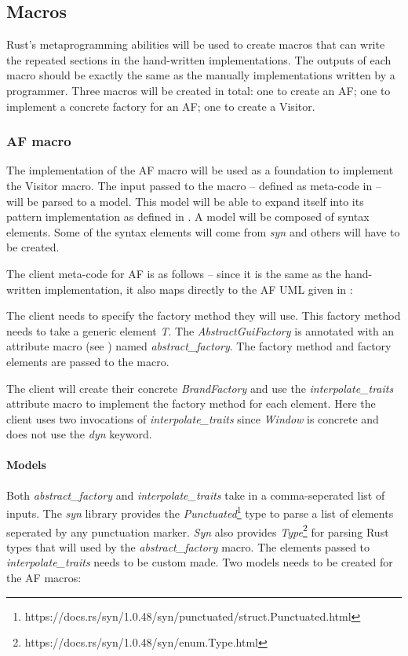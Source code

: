 
\subsection{Macros}
Rust's metaprogramming abilities will be used to create macros that can write the repeated sections in the hand-written implementations.
The outputs of each macro should be exactly the same as the manually implementations written by a programmer.
Three macros will be created in total: one to create an AF; one to implement a concrete factory for an AF; one to create a Visitor.

\subsubsection{AF macro}
The implementation of the AF macro will be used as a foundation to implement the Visitor macro.
The input passed to the macro -- defined as meta-code in  -- will be parsed to a model.
This model will be able to expand itself into its pattern implementation as defined in .
A model will be composed of syntax elements.
Some of the syntax elements will come from \textit{syn} and others will have to be created.

The client meta-code for AF is as follows -- since it is the same as the hand-written implementation, it also maps directly to the AF UML given in :


The client needs to specify the factory method they will use.
This factory method needs to take a generic element \textit{T}.
The \textit{AbstractGuiFactory} is annotated with an attribute macro (see ) named \textit{abstract\_factory}.
The factory method and factory elements are passed to the macro.

The client will create their concrete \textit{BrandFactory} and use the \textit{interpolate\_traits} attribute macro to implement the factory method for each element.
Here the client uses two invocations of \textit{interpolate\_traits} since \textit{Window} is concrete and does not use the \textit{dyn} keyword.

\paragraph{Models}
Both \textit{abstract\_factory} and \textit{interpolate\_traits} take in a comma-seperated list of inputs.
The \textit{syn} library provides the \textit{Punctuated}\footnote{https://docs.rs/syn/1.0.48/syn/punctuated/struct.Punctuated.html} type to parse a list of elements seperated by any punctuation marker.
\textit{Syn} also provides \textit{Type}\footnote{https://docs.rs/syn/1.0.48/syn/enum.Type.html} for parsing Rust types that will used by the \textit{abstract\_factory} macro.
The elements passed to \textit{interpolate\_traits} needs to be custom made.
Two models needs to be created for the AF macros:

